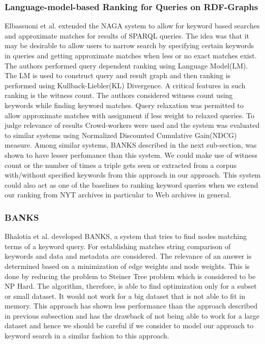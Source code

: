 \documentclass{article}
\begin{document}
    \subsubsection{Language-model-based Ranking for Queries on RDF-Graphs}
    Elbassuoni et al.\cite{elbassuoni08} extended the NAGA system\cite{kasneci08} to allow for keyword based searches and approximate matches for results of SPARQL queries. The idea was that it may be desirable to allow users to narrow search by specifying certain keywords in queries and getting approximate matches when less or no exact matches exist. The authors performed query dependent ranking using Language Model(LM). The LM is used to construct query and result graph and then ranking is performed using Kullback-Liebler(KL) Divergence. A critical features in such ranking is the witness count. The authors considered witness count using keywords while finding keyword matches. Query relaxation was permitted to allow approximate matches with assignment if less weight to relaxed queries. To judge relevance of results Crowd-workers were used and the system was evaluated to similar systems using Normalized Discounted Cumulative Gain(NDCG) measure. Among similar systems, BANKS\cite{bhalotia02} described in the next sub-section, was shown to have lesser perfomance than this system. We could make use of witness count or the number of times a triple gets seen or extracted from a corpus with/without specified keywords from this approach in our approach. This system could also act as one of the baselines to ranking keyword queries when we extend our ranking from NYT archives in particular to Web archives in general.

    \subsubsection{BANKS}
    Bhalotia et al.\cite{bhalotia02} developed BANKS, a system that tries to find nodes matching terms of a keyword query. For establishing matches string comparison of keywords and data and metadata are considered. The relevance of an answer is determined based on a minimization of edge weights and node weights. This is done by reducing the problem to Steiner Tree problem which is considered to be NP Hard. The algorithm, therefore, is able to find optimization only for a subset or small dataset. It would not work for a big dataset that is not able to fit in memory. This approach has shown less performance than the approach described in previous subsection\cite{elbassuoni08} and has the drawback of not being able to work for a large dataset and hence we should be careful if we consider to model our approach to keyword search in a similar fashion to this approach.
\end{document}
